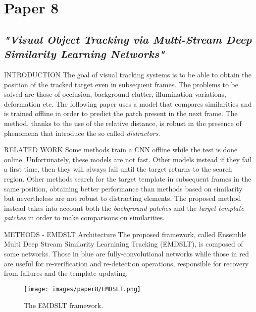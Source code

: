 \section{Paper 8}
\subsection{\emph{"Visual Object Tracking via Multi-Stream Deep Similarity Learning Networks"}}

\begin{frame}{INTRODUCTION}
    The goal of visual tracking systems is to be able to obtain the position of 
    the tracked target even in subsequent frames. The problems to be solved 
    are those of occlusion, background clutter, illumination variations, 
    deformation etc. The following paper uses a model that compares 
    similarities and is trained offline in order to predict the patch present in 
    the next frame. The method, thanks to the use of the relative distance, 
    is robust in the presence of phenomena that introduce the so called 
    \emph{distractors}.
\end{frame}

\begin{frame}{RELATED WORK}
    Some methods train a CNN offline while the test is done online. Unfortunately, 
    these models are not fast. Other models instead if they fail a first 
    time, then they will always fail until the target returns to the search region. 
    Other methods   search for the target template in subsequent frames 
    in the same position, obtaining better performance than methods based on 
    similarity but nevertheless are not robust to distracting elements. The proposed 
    method instead takes into account both the \emph{background patches} and 
    the \emph{target template patches} in order to make comparisons on similarities.
\end{frame}

\begin{frame}{METHODS - EMDSLT Architecture}
    The proposed framework, called Ensemble Multi Deep Stream Similarity 
    Learnining Tracking (EMDSLT), is composed of some networks. Those 
    in blue are fully-convolutional networks while those in red are useful for 
    re-verification and re-detection operations, responsible for recovery from 
    failures and the template updating.
    \begin{figure}[h!]
        \centering
        \texttt{[image: images/paper8/EMDSLT.png]}
        \centering
        \caption{The EMDSLT framework.}
        \label{fig:EMDSLT}
    \end{figure}
\end{frame}

